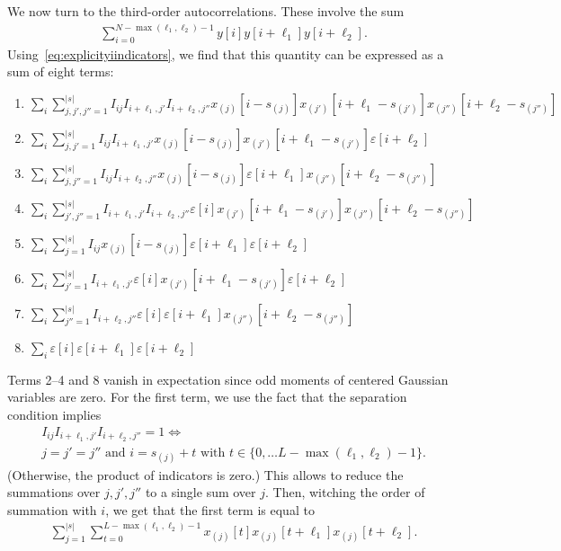 \documentclass[12pt]{article}
\newcommand{\1}{\mathbf{1}}
\theoremstyle{plain}
\theoremstyle{definition}
\theoremstyle{remark}
\theoremstyle{plain}
\theoremstyle{remark}
\theoremstyle{plain}
\theoremstyle{plain}
\theoremstyle{plain}
\numberwithin{equation}{section}
\begin{document}
We now turn to the third-order autocorrelations. These involve the sum
\begin{align}
\sum_{i=0}^{N-\max(\ell_1, \ell_2)-1} y[i] y[i+\ell_1] y[i+\ell_2].
\end{align}
Using~\eqref{eq:explicityiindicators}, we find that this quantity can be expressed as a sum of eight terms:
\begin{enumerate}
	\item $\sum_i \sum_{j,j',j'' = 1}^{|s|} I_{ij} I_{i+\ell_1, j'} I_{i+\ell_2,j''} x_{(j)}[i-s_{(j)}] x_{(j')}[i+\ell_1-s_{(j')}] x_{(j'')}[i+\ell_2-s_{(j'')}]$
	\item $\sum_i \sum_{j,j' = 1}^{|s|} I_{ij} I_{i+\ell_1, j'} x_{(j)}[i-s_{(j)}] x_{(j')}[i+\ell_1-s_{(j')}] \varepsilon[i+\ell_2]$
	\item $\sum_i \sum_{j,j'' = 1}^{|s|} I_{ij} I_{i+\ell_2,j''} x_{(j)}[i-s_{(j)}] \varepsilon[i+\ell_1] x_{(j'')}[i+\ell_2-s_{(j'')}]$
	\item $\sum_i \sum_{j',j'' = 1}^{|s|} I_{i+\ell_1, j'} I_{i+\ell_2,j''} \varepsilon[i] x_{(j')}[i+\ell_1-s_{(j')}] x_{(j'')}[i+\ell_2-s_{(j'')}]$
	\item $\sum_i \sum_{j = 1}^{|s|} I_{ij} x_{(j)}[i-s_{(j)}] \varepsilon[i+\ell_1] \varepsilon[i+\ell_2]$
	\item $\sum_i \sum_{j' = 1}^{|s|} I_{i+\ell_1, j'} \varepsilon[i] x_{(j')}[i+\ell_1-s_{(j')}] \varepsilon[i+\ell_2]$
	\item $\sum_i \sum_{j'' = 1}^{|s|} I_{i+\ell_2,j''} \varepsilon[i] \varepsilon[i+\ell_1] x_{(j'')}[i+\ell_2-s_{(j'')}]$
	\item $\sum_i \varepsilon[i] \varepsilon[i+\ell_1] \varepsilon[i+\ell_2]$
\end{enumerate}
Terms 2--4 and 8 vanish in expectation since odd moments of centered Gaussian variables are zero. For the first term, we use the fact that the separation condition implies
\begin{multline}
I_{ij} I_{i+\ell_1, j'} I_{i+\ell_2,j''} = 1 \iff \\ j=j'=j'' \textrm{ and } i = s_{(j)} + t \textrm{ with } t \in \{ 0, \ldots L-\max(\ell_1, \ell_2)-1 \}.
\end{multline}
(Otherwise, the product of indicators is zero.) This allows to reduce the summations over $j,j',j''$ to a single sum over $j$. Then, witching the order of summation with $i$, we get that the first term is equal to
\begin{align}
\sum_{j=1}^{|s|} \sum_{t=0}^{L-\max(\ell_1, \ell_2)-1} x_{(j)}[t] x_{(j)}[t+\ell_1] x_{(j)}[t+\ell_2].
\end{align}
\end{document}

